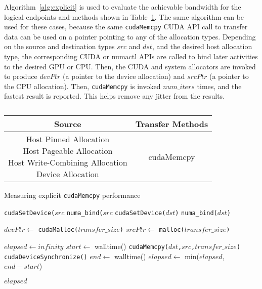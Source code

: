 Algorithm~\ref{alg:explicit} is used to evaluate the achievable bandwidth for the logical endpoints and methods shown in Table~\ref{tab:explicit-cpu-gpu}.
The same algorithm can be used for these cases, because the same \texttt{cudaMemcpy} CUDA API call to transfer data can be used on a pointer pointing to any of the allocation types.
Depending on the source and destination types $src$ and $dst$, and the desired host allocation type, the corresponding CUDA or numactl APIs are called to bind later activities to the desired GPU or CPU.
Then, the CUDA and system allocators are invoked to produce $devPtr$ (a pointer to the device allocation) and $srcPtr$ (a pointer to the CPU allocation).
Then, \texttt{cudaMemcpy} is invoked $num\_iters$ times, and the fastest result is reported.
This helps remove any jitter from the results.

\begin{table}[ht]
    \centering
    \caption[]{}
    \label{tab:explicit-cpu-gpu}
    \begin{tabular}{|c|c|}
    \hline
    \textbf{Source} & \textbf{Transfer Methods} \\ \hline 
    \makecell{Host Pinned Allocation \\ Host Pageable Allocation \\ Host Write-Combining Allocation \\ Device Allocation} & cudaMemcpy \\ \hline
    \end{tabular}
\end{table}

\begin{algorithm}
    \caption{Measuring explicit \texttt{cudaMemcpy} performance}
    \label{alg:explicit}
    \begin{algorithmic}[1]
    \Statex
            \State \texttt{cudaSetDevice($src$}
        \Else {}
            \State \texttt{numa\_bind($src$}
        \EndIf
        \State \texttt{cudaSetDevice($dst$)}
        \Else {}
        \State \texttt{numa\_bind($dst$)}
        \EndIf

        \State $devPtr \gets$ \texttt{cudaMalloc($transfer\_size$)} 
        \State $srcPtr \gets$ \texttt{malloc($transfer\_size$)} 

        \State $elapsed \gets infinity$ 
            \State $start \gets$ walltime()
            \State \texttt{cudaMemcpy($dst$,$src$,$transfer\_size$)}
            \State \texttt{cudaDeviceSynchronize()}
            \State $end \gets$ walltime()
            \State $elapsed \gets$ min($elapsed$, $end-start$)
        \EndFor

        \Return $elapsed$
    \EndFunction

    \end{algorithmic}
\end{algorithm}

